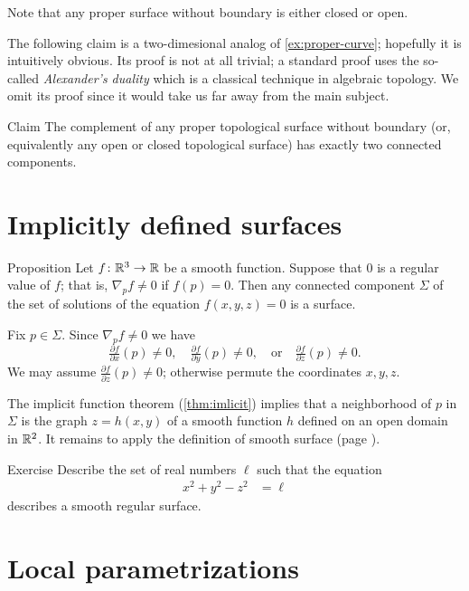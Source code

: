 Note that any proper surface without boundary is either closed or open.

The following claim is a two-dimesional analog of \ref{ex:proper-curve};
hopefully it is intuitively obvious. 
Its proof is not at all trivial; a standard proof uses the so-called \emph{Alexander's duality} which is a classical technique in algebraic topology. %
We omit its proof since it would take us far away from the main subject.

\begin{thm}{Claim}\label{clm:proper-divides}
The complement of any proper topological surface without boundary (or, equivalently any open or closed topological surface) has exactly two connected components. 
\end{thm}

\section*{Implicitly defined surfaces}

\begin{thm}{Proposition}\label{prop:implicit-surface}
Let $f\colon\mathbb{R}^3\to \mathbb{R}$ be a smooth function.
Suppose that $0$ is a regular value of $f$;
that is, $\nabla_p f\ne 0$ if $f(p)=0$.
Then any connected component $\Sigma$ of the set of solutions of the equation $f(x,y,z)=0$ is a surface.
\end{thm}

Fix $p\in\Sigma$.
Since $\nabla_p f\ne 0$ we have 
\[\tfrac{\partial f}{\partial x}(p)\ne 0,\quad \tfrac{\partial f}{\partial y}(p)\ne 0,\quad \text{or}\quad\tfrac{\partial f}{\partial z}(p)\ne 0.\]
We may assume $\tfrac{\partial f}{\partial z}(p)\ne 0$;
otherwise permute the coordinates $x,y,z$.

The implicit function theorem (\ref{thm:imlicit}) implies that a neighborhood of $p$ in $\Sigma$ is the graph $z=h(x,y)$ of a smooth function $h$ defined on an open domain in $\mathbb{R}^2$.
It remains to apply the definition of smooth surface (page \pageref{page:def-smooth-surface}).
\qeds

\begin{thm}{Exercise}\label{ex:hyperboloinds}
Describe the set of real numbers $\ell$
such that the equation
\begin{align*}
x^2+y^2-z^2&=\ell
\end{align*}
describes a smooth regular surface.
\end{thm}

\section*{Local parametrizations}

